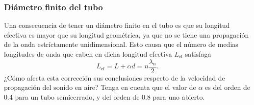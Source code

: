\documentclass[laboratorio]{guia}
\begin{document}
\subsubsection{Diámetro finito del tubo} 
Una consecuencia de tener un diámetro finito en el tubo es que su longitud efectiva es mayor que su longitud geométrica, ya que no se tiene una propagación de la onda estríctamente unidimensional.
Esto causa que el número de medias longitudes de onda que caben en dicha longitud efectiva \(L_\text{ef}\) satisfaga
\begin{equation*}
  L_\text{ef} = L + \alpha d = n \frac{\lambda_n}{2}.
\end{equation*}
¿Cómo afecta esta corrección sus conclusiones respecto de la velocidad de propagación del sonido en aire?
Tenga en cuenta que el valor de \(\alpha\) es del orden de 0.4 para un tubo semicerrado, y del orden de 0.8 para uno abierto.


%
%

\nocite{Alonso1998,Crawford1994}
 

\end{document}

